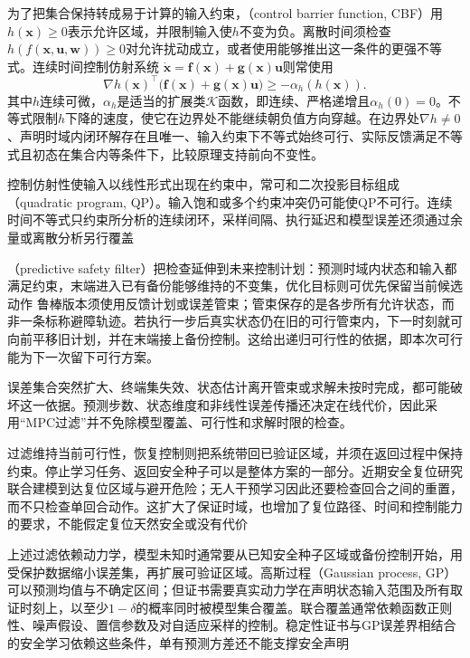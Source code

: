 为了把集合保持转成易于计算的输入约束，（control barrier function, CBF）用$h(\bm{x})\geq0$表示允许区域，并限制输入使$h$不变为负。离散时间须检查
$h(f(\bm{x},\bm{u},\bm{w}))\geq0$对允许扰动成立，或者使用能够推出这一条件的更强不等式。连续时间控制仿射系统
$\dot{\bm{x}}=\bm{f}(\bm{x})+\bm{g}(\bm{x})\bm{u}$则常使用
\[
  \nabla h(\bm{x})^\top
       \bigl(\bm{f}(\bm{x})+\bm{g}(\bm{x})\bm{u}\bigr)
        \geq-\alpha_h(h(\bm{x})).
\]
其中$h$连续可微，$\alpha_h$是适当的扩展类$\mathcal K$函数，即连续、严格递增且$\alpha_h(0)=0$。不等式限制$h$下降的速度，使它在边界处不能继续朝负值方向穿越。在边界处$\nabla h\neq0$、声明时域内闭环解存在且唯一、输入约束下不等式始终可行、实际反馈满足不等式且初态在集合内等条件下，比较原理支持前向不变性。

控制仿射性使输入以线性形式出现在约束中，常可和二次投影目标组成（quadratic program, QP）。输入饱和或多个约束冲突仍可能使QP不可行。连续时间不等式只约束所分析的连续闭环，采样间隔、执行延迟和模型误差还须通过余量或离散分析另行覆盖

（predictive safety filter）把检查延伸到未来控制计划：预测时域内状态和输入都满足约束，末端进入已有备份能够维持的不变集，优化目标则可优先保留当前候选动作
鲁棒版本须使用反馈计划或误差管束；管束保存的是各步所有允许状态，而非一条标称避障轨迹。若执行一步后真实状态仍在旧的可行管束内，下一时刻就可向前平移旧计划，并在末端接上备份控制。这给出递归可行性的依据，即本次可行能为下一次留下可行方案。

误差集合突然扩大、终端集失效、状态估计离开管束或求解未按时完成，都可能破坏这一依据。预测步数、状态维度和非线性误差传播还决定在线代价，因此采用“MPC过滤”并不免除模型覆盖、可行性和求解时限的检查。

过滤维持当前可行性，恢复控制则把系统带回已验证区域，并须在返回过程中保持约束。停止学习任务、返回安全种子可以是整体方案的一部分。近期安全复位研究联合建模到达复位区域与避开危险；无人干预学习因此还要检查回合之间的重置，而不只检查单回合动作。这扩大了保证时域，也增加了复位路径、时间和控制能力的要求，不能假定复位天然安全或没有代价

上述过滤依赖动力学，模型未知时通常要从已知安全种子区域或备份控制开始，用受保护数据缩小误差集，再扩展可验证区域。高斯过程（Gaussian process, GP）可以预测均值与不确定区间；但证书需要真实动力学在声明状态输入范围及所有取证时刻上，以至少$1-\delta$的概率同时被模型集合覆盖。联合覆盖通常依赖函数正则性、噪声假设、置信参数及对自适应采样的控制。稳定性证书与GP误差界相结合的安全学习依赖这些条件，单有预测方差还不能支撑安全声明

